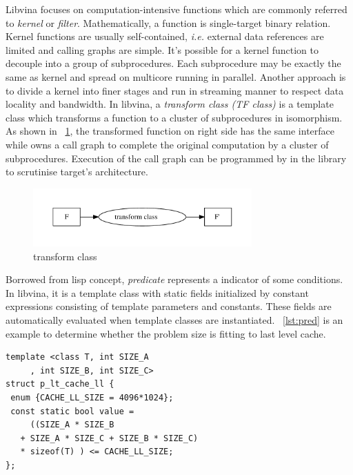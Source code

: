 \documentclass[10pt, conference, compsocconf]{IEEEtran}
\begin{document}
Libvina focuses on computation-intensive functions which are commonly referred to \emph{kernel} or \emph{filter}. Mathematically, a function is single-target binary relation. Kernel functions are usually self-contained, \textit{i.e.} external data references are limited and calling graphs are simple. It's possible for a kernel function to decouple into a group of subprocedures. Each subprocedure may be exactly the same as kernel and spread on multicore running in parallel.  Another approach is to divide a kernel into finer stages and run in streaming manner to respect data locality and bandwidth. In libvina, a \emph{transform class (TF class)} is a template class which transforms a function to a cluster of subprocedures in isomorphism. As shown in ~\ref{fig:tfcls}, the transformed function on right side has the same interface while owns a call graph to complete the original computation by a cluster of subprocedures. Execution of the call graph can be programmed by in the library to scrutinise target's architecture.

\begin{figure}
\centering
\includegraphics[width=3.3in]{map-class}
\caption{transform class}
\label{fig:tfcls}
\end{figure}


Borrowed from lisp concept, \emph{predicate} represents a indicator of some conditions. In libvina, it is a template class with static fields initialized by constant expressions consisting of template parameters and constants. These fields are automatically evaluated when template classes are instantiated. ~\ref{lst:pred} is an example to determine whether the problem size is fitting to last level cache.

\makebox[3.1\width]{\hrulefill}
\begin{verbatim}
template <class T, int SIZE_A
     , int SIZE_B, int SIZE_C>
struct p_lt_cache_ll {
 enum {CACHE_LL_SIZE = 4096*1024};
 const static bool value = 
     ((SIZE_A * SIZE_B 
   + SIZE_A * SIZE_C + SIZE_B * SIZE_C) 
   * sizeof(T) ) <= CACHE_LL_SIZE;
};
\end{verbatim}

\end{document}
